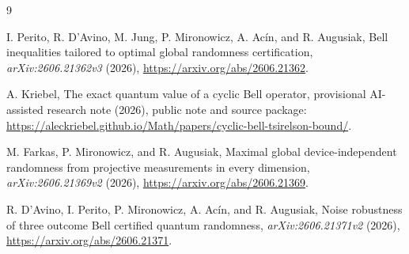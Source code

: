 \documentclass[11pt]{article}
\theoremstyle{remark}
\begin{document}
\begin{thebibliography}{9}

I. Perito, R. D'Avino, M. Jung, P. Mironowicz, A. Ac\'in, and R. Augusiak,
\newblock Bell inequalities tailored to optimal global randomness
  certification,
\newblock \emph{arXiv:2606.21362v3} (2026),
\newblock \url{https://arxiv.org/abs/2606.21362}.

A. Kriebel,
\newblock The exact quantum value of a cyclic Bell operator,
\newblock provisional AI-assisted research note (2026),
\newblock public note and source package:
\url{https://aleckriebel.github.io/Math/papers/cyclic-bell-tsirelson-bound/}.

M. Farkas, P. Mironowicz, and R. Augusiak,
\newblock Maximal global device-independent randomness from projective
  measurements in every dimension,
\newblock \emph{arXiv:2606.21369v2} (2026),
\newblock \url{https://arxiv.org/abs/2606.21369}.

R. D'Avino, I. Perito, P. Mironowicz, A. Ac\'in, and R. Augusiak,
\newblock Noise robustness of three outcome Bell certified quantum randomness,
\newblock \emph{arXiv:2606.21371v2} (2026),
\newblock \url{https://arxiv.org/abs/2606.21371}.

\end{thebibliography}
\end{document}
